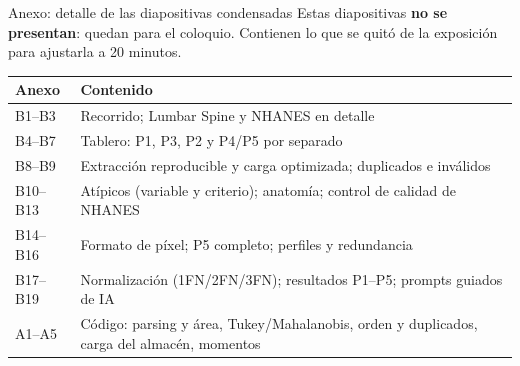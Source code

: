 \documentclass[aspectratio=169,10pt]{beamer}
\begin{document}
{
\begin{frame}[plain]
\end{frame}}


\appendix


\begin{frame}{Anexo: detalle de las diapositivas condensadas}
  \footnotesize
  Estas diapositivas \textbf{no se presentan}: quedan para el coloquio. Contienen lo que se quitó de la exposición para ajustarla a 20 minutos.\\[1ex]
  \renewcommand{\arraystretch}{1.25}
  \begin{tabularx}{\linewidth}{@{}lX@{}}
    \toprule
    Anexo & Contenido \\ \midrule
    B1--B3 & Recorrido; Lumbar Spine y NHANES en detalle \\
    B4--B7 & Tablero: P1, P3, P2 y P4/P5 por separado \\
    B8--B9 & Extracción reproducible y carga optimizada; duplicados e inválidos \\
    B10--B13 & Atípicos (variable y criterio); anatomía; control de calidad de NHANES \\
    B14--B16 & Formato de píxel; P5 completo; perfiles y redundancia \\
    B17--B19 & Normalización (1FN/2FN/3FN); resultados P1--P5; prompts guiados de IA \\
    A1--A5 & Código: parsing y área, Tukey/Mahalanobis, orden y duplicados, carga del almacén, momentos \\ \bottomrule
  \end{tabularx}
\end{frame}
\end{document}

